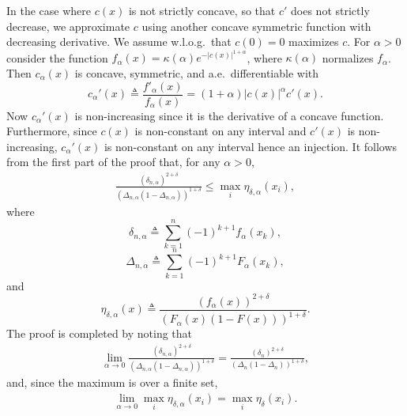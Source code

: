 \begin{proof-of-lemma}[\ref{lem:bound_intervals_delta}]
  In the case where $c(x)$ is not strictly concave, so that $c'$ does not
  strictly decrease, we approximate $c$ using another concave symmetric
  function with decreasing derivative. We assume w.l.o.g.\ that $c(0) = 0$
  maximizes $c$.  For $\alpha>0$ consider the function $f_\alpha(x) =
  \kappa(\alpha) e^{-|c(x)|^{1+\alpha}}$, where $\kappa(\alpha)$ normalizes
  $f_\alpha$.  Then $c_\alpha(x)$ is concave, symmetric, and
  a.e.\ differentiable with
  \begin{equation*}
    c_\alpha'(x) \triangleq \frac{f'_\alpha(x)}{f_\alpha(x)} = (1+\alpha)|c(x)|^{\alpha} c'(x). 
  \end{equation*}
  Now $c_\alpha'(x)$ is non-increasing since it is the derivative of a concave
  function. Furthermore, since $c(x)$ is non-constant on any interval and
  $c'(x)$ is non-increasing, $c_\alpha'(x)$ is non-constant on any interval
  hence an injection. It follows from the first part of the proof that, for
  any $\alpha>0$,
  \begin{align}
    \label{eq:proof:lem:bound_intervals}
    \frac{(\delta_{n,\alpha})^{2+\delta}}{\left(\Delta_{n,\alpha}(1-\Delta_{n,\alpha})\right)^{1+\delta}} \leq \max_i \eta_{\delta,\alpha}(x_i),
  \end{align}
  where 
  \begin{equation*}
    \delta_{n,\alpha} \triangleq  \sum_{k=1}^{n} (-1)^{k+1} f_{\alpha}(x_k),
  \end{equation*}
  \begin{equation*}
    \Delta_{n,\alpha} \triangleq \sum_{k=1}^n (-1)^{k+1} F_{\alpha}(x_k), 
  \end{equation*}
  and 
  \begin{equation*}
    \eta_{\delta,\alpha}(x) \triangleq \frac{(f_\alpha(x))^{2+\delta}}{\left(F_{\alpha}(x)(1-F(x)) \right)^{1+\delta}}. 
  \end{equation*}
  The proof is completed by noting that 
  \begin{align*}
    \lim_{\alpha \to 0} \frac{(\delta_{n,\alpha})^{2+\delta} }{ \left(\Delta_{n,\alpha}(1-\Delta_{n,\alpha})\right)^{1+\delta}}  = \frac{(\delta_{n})^{2+\delta }}{\left(\Delta_{n}(1-\Delta_{n}) \right)^{1+\delta}},  
  \end{align*}
  and, since the maximum is over a finite set,
  \begin{align*}
    \lim_{\alpha \to 0}  \max_i \eta_{\delta,\alpha}(x_i)  = \max_i\eta_\delta(x_i).
  \end{align*}


\end{proof-of-lemma}

